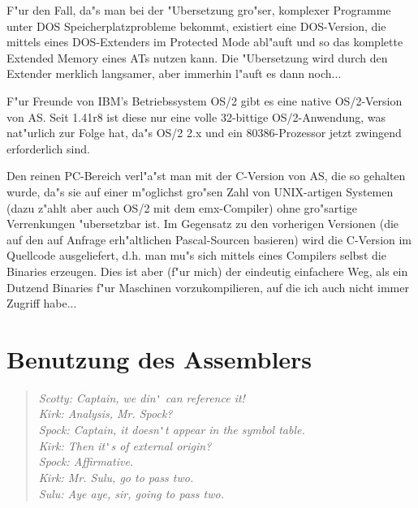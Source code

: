 \documentclass[12pt,a4paper,twoside]{report}
\begin{document}
F"ur den Fall, da"s  man bei der "Ubersetzung
gro"ser, komplexer Programme unter DOS Speicherplatzprobleme bekommt,
existiert eine DOS-Version, die mittels eines DOS-Extenders im Protected
Mode abl"auft und so das komplette Extended Memory eines ATs nutzen kann.
Die "Ubersetzung wird durch den Extender merklich langsamer, aber immerhin
l"auft es dann noch...

F"ur Freunde von IBM's Betriebssystem OS/2  gibt es
eine native OS/2-Version von AS.  Seit 1.41r8 ist diese nur eine volle
32-bittige OS/2-Anwendung, was nat"urlich zur Folge hat, da"s OS/2 2.x
und ein 80386-Prozessor jetzt zwingend erforderlich sind.

Den reinen PC-Bereich verl"a"st man mit der 
C-Version von AS, die so gehalten wurde, da"s sie auf einer m"oglichst
gro"sen Zahl von UNIX-artigen Systemen (dazu z"ahlt aber auch OS/2 mit dem
emx-Compiler) ohne gro"sartige Verrenkungen "ubersetzbar ist.  Im
Gegensatz zu den vorherigen Versionen (die auf den auf Anfrage
erh"altlichen Pascal-Sourcen basieren) wird die C-Version im Quellcode
ausgeliefert, d.h. man mu"s sich mittels eines Compilers selbst die
Binaries erzeugen.  Dies ist aber (f"ur mich) der eindeutig einfachere
Weg, als ein Dutzend Binaries f"ur Maschinen vorzukompilieren, auf die ich
auch nicht immer Zugriff habe...


\cleardoublepage
\chapter{Benutzung des Assemblers}

\begin{quote}\begin{raggedright}{\it
Scotty: Captain, we din\verb!'! can reference it! \\
Kirk:   Analysis, Mr. Spock? \\
Spock:  Captain, it doesn\verb!'!t appear in the symbol table. \\
Kirk:   Then it\verb!'!s of external origin? \\
Spock:  Affirmative. \\
Kirk:   Mr. Sulu, go to pass two. \\
Sulu:   Aye aye, sir, going to pass two. \\
}\end{raggedright}\end{quote}
\end{document}
